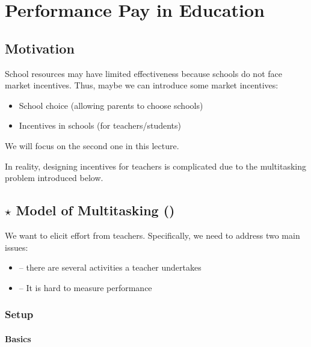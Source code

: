 \chapter{Performance Pay in Education}


\section{Motivation}

    School resources may have limited effectiveness because schools do not face market incentives. Thus, maybe we can introduce some market incentives:
    \begin{itemize}
        \item School choice (allowing parents to choose schools)
        \item Incentives in schools (for teachers/students)
    \end{itemize}
    We will focus on the second one in this lecture.
    
    In reality, designing incentives for teachers is complicated due to the multitasking problem introduced below.

\section{$\star$ Model of Multitasking (\cite{neal_chapter_2011})}
    
    We want to elicit effort from teachers. Specifically, we need to address two main issues:
    \begin{itemize}
        \item {} -- there are several activities a teacher undertakes
        \item {} -- It is hard to measure performance
    \end{itemize}
    
    \subsection{Setup}
        
        \subsubsection{Basics}
            
